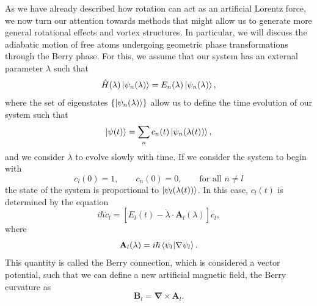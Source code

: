 As we have already described how rotation can act as an artificial Lorentz force, we now turn our attention towards methods that might allow us to generate more general rotational effects and vortex structures.
In particular, we will discuss the adiabatic motion of free atoms undergoing geometric phase transformations through the Berry phase. 
For this, we assume that our system has an external parameter $\lambda$ such that
\begin{equation}
\hat H(\lambda) \ket{\psi_n(\lambda)} = E_n(\lambda)\ket{\psi_n(\lambda)},
\end{equation}
where the set of eigenstates $\left\{ \ket{\psi_n(\lambda)} \right\}$ allow us to define the time evolution of our system such that
\begin{equation}
\ket{\psi(t)} = \sum_n c_n(t) \ket{\psi_n(\lambda(t))},
\end{equation}
and we consider $\lambda$ to evolve slowly with time. If we consider the system to begin with
\begin{equation}
c_l(0) = 1,
\qquad
c_n(0) = 0, 
\qquad
\text{for all } n\neq l
\end{equation}
the state of the system is proportional to $\ket{\psi_l(\lambda(t))}$.
In this case, $c_l(t)$ is determined by the equation
\begin{equation}
i \hbar \dot{c}_l =  [E_l(t) - \dot{\lambda} \cdot \mathbf{A}_l(\lambda)]c_l,
\label{Bcnx-1}
\end{equation}
where 
\begin{equation}
\mathbf{A}_l(\lambda) = i \hbar \braket{\psi_l|\nabla\psi_l}.
\label{eqn:Bcnx}
\end{equation}
This quantity is called the Berry connection, which is considered a vector potential, such that we can define a new artificial magnetic field, the Berry curvature as
\begin{equation}
\mathbf{B}_l = \mathbf{\nabla} \times \mathbf{A}_l.
\label{eqn:BC}
\end{equation}

